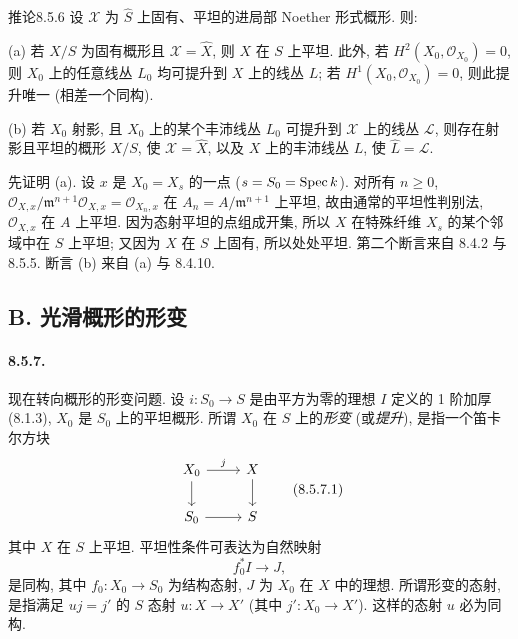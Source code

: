 \begin{origstatement}{推论}{8.5.6}\label{ch08:cor856}
设 $\mathcal X$ 为 $\widehat S$ 上固有、平坦的进局部 Noether 形式概形. 则:

(a) 若 $X/S$ 为固有概形且 $\mathcal X=\widehat X$, 则 $X$ 在 $S$ 上平坦. 此外, 若 $H^2(X_0,\mathcal O_{X_0})=0$, 则 $X_0$ 上的任意线丛 $L_0$ 均可提升到 $X$ 上的线丛 $L$; 若 $H^1(X_0,\mathcal O_{X_0})=0$, 则此提升唯一 (相差一个同构).

(b) 若 $X_0$ 射影, 且 $X_0$ 上的某个丰沛线丛 $L_0$ 可提升到 $\mathcal X$ 上的线丛 $\mathcal L$, 则存在射影且平坦的概形 $X/S$, 使 $\mathcal X=\widehat X$, 以及 $X$ 上的丰沛线丛 $L$, 使 $\widehat L=\mathcal L$.
\end{origstatement}
先证明 (a). 设 $x$ 是 $X_0=X_s$ 的一点 ($s=S_0=\operatorname{Spec} k$). 对所有 $n\geq0$, $\mathcal O_{X,x}/\mathfrak m^{n+1}\mathcal O_{X,x}=\mathcal O_{X_n,x}$ 在 $A_n=A/\mathfrak m^{n+1}$ 上平坦, 故由通常的平坦性判别法, $\mathcal O_{X,x}$ 在 $A$ 上平坦. 因为态射平坦的点组成开集, 所以 $X$ 在特殊纤维 $X_s$ 的某个邻域中在 $S$ 上平坦; 又因为 $X$ 在 $S$ 上固有, 所以处处平坦. 第二个断言来自 8.4.2 与 8.5.5. 断言 (b) 来自 (a) 与 8.4.10.

\subsection*{B. 光滑概形的形变}
\paragraph{8.5.7.}
现在转向概形的形变问题. 设 $i:S_0\to S$ 是由平方为零的理想 $I$ 定义的 1 阶加厚 (8.1.3), $X_0$ 是 $S_0$ 上的平坦概形. 所谓 $X_0$ 在 $S$ 上的\emph{形变} (或\emph{提升}), 是指一个笛卡尔方块
\begin{equation}
\begin{tikzcd}X_0\arrow[r,"j"]\arrow[d]&X\arrow[d]\\S_0\arrow[r]&S\end{tikzcd}
\tag{8.5.7.1}\label{ch08:eq8571}\end{equation}
其中 $X$ 在 $S$ 上平坦. 平坦性条件可表达为自然映射
\begin{equation}f_0^*I\longrightarrow J,\tag{8.5.7.2}\label{ch08:eq8572}\end{equation}
是同构, 其中 $f_0:X_0\to S_0$ 为结构态射, $J$ 为 $X_0$ 在 $X$ 中的理想. 所谓形变的态射, 是指满足 $uj=j'$ 的 $S$ 态射 $u:X\to X'$ (其中 $j':X_0\to X'$). 这样的态射 $u$ 必为同构.

